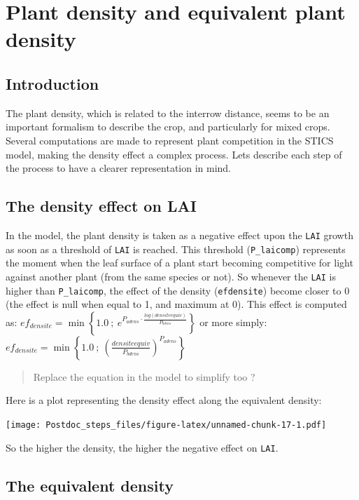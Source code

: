 \documentclass[]{book}
\theoremstyle{definition}
\theoremstyle{definition}
\theoremstyle{definition}
\theoremstyle{remark}
\begin{document}
\chapter{Plant density and equivalent plant density}\label{plantdensity}

\section{Introduction}\label{introduction-2}

The plant density, which is related to the interrow distance, seems to
be an important formalism to describe the crop, and particularly for
mixed crops. Several computations are made to represent plant
competition in the STICS model, making the density effect a complex
process. Lets describe each step of the process to have a clearer
representation in mind.

\section{The density effect on LAI}\label{the-density-effect-on-lai}

In the model, the plant density is taken as a negative effect upon the
\texttt{LAI} growth as soon as a threshold of \texttt{LAI} is reached.
This threshold (\texttt{P\_laicomp}) represents the moment when the leaf
surface of a plant start becoming competitive for light against another
plant (from the same species or not). So whenever the \texttt{LAI} is
higher than \texttt{P\_laicomp}, the effect of the density
(\texttt{efdensite}) become closer to 0 (the effect is null when equal
to 1, and maximum at 0). This effect is computed as:
\(ef_{densite}=\min\left\{1.0\ ;\ e^{P_{adens}\cdot\frac{log(densiteequiv)}{P_{bdens}}}\right\}\)
or more simply:
\(ef_{densite}=\min\left\{1.0\ ;\ (\frac{densiteequiv}{P_{bdens}})^{P_{adens}}\right\}\)

\begin{quote}
Replace the equation in the model to simplify too ?
\end{quote}

Here is a plot representing the density effect along the equivalent
density:

\texttt{[image: Postdoc\_steps\_files/figure-latex/unnamed-chunk-17-1.pdf]}

So the higher the density, the higher the negative effect on
\texttt{LAI}.

\section{The equivalent density}\label{the-equivalent-density}
\end{document}
